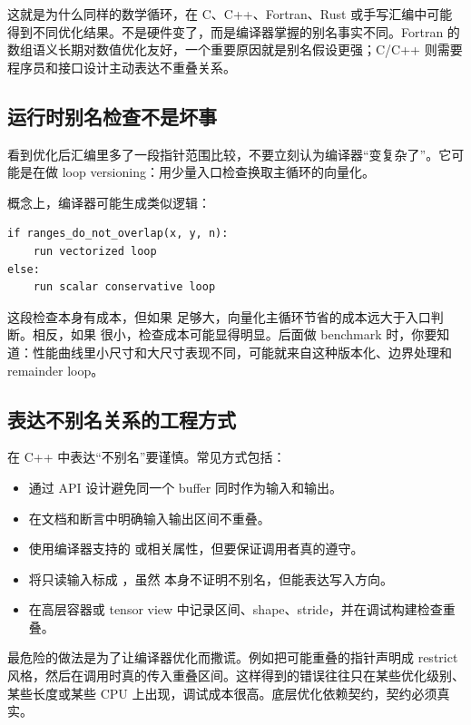 这就是为什么同样的数学循环，在 C、C++、Fortran、Rust 或手写汇编中可能得到不同优化结果。不是硬件变了，而是编译器掌握的别名事实不同。Fortran 的数组语义长期对数值优化友好，一个重要原因就是别名假设更强；C/C++ 则需要程序员和接口设计主动表达不重叠关系。

\subsection{运行时别名检查不是坏事}

看到优化后汇编里多了一段指针范围比较，不要立刻认为编译器“变复杂了”。它可能是在做 loop versioning：用少量入口检查换取主循环的向量化。

概念上，编译器可能生成类似逻辑：

\begin{lstlisting}
if ranges_do_not_overlap(x, y, n):
    run vectorized loop
else:
    run scalar conservative loop
\end{lstlisting}

这段检查本身有成本，但如果  足够大，向量化主循环节省的成本远大于入口判断。相反，如果  很小，检查成本可能显得明显。后面做 benchmark 时，你要知道：性能曲线里小尺寸和大尺寸表现不同，可能就来自这种版本化、边界处理和 remainder loop。

\subsection{表达不别名关系的工程方式}

在 C++ 中表达“不别名”要谨慎。常见方式包括：

\begin{itemize}
  \item 通过 API 设计避免同一个 buffer 同时作为输入和输出。
  \item 在文档和断言中明确输入输出区间不重叠。
  \item 使用编译器支持的  或相关属性，但要保证调用者真的遵守。
  \item 将只读输入标成 ，虽然  本身不证明不别名，但能表达写入方向。
  \item 在高层容器或 tensor view 中记录区间、shape、stride，并在调试构建检查重叠。
\end{itemize}

最危险的做法是为了让编译器优化而撒谎。例如把可能重叠的指针声明成 restrict 风格，然后在调用时真的传入重叠区间。这样得到的错误往往只在某些优化级别、某些长度或某些 CPU 上出现，调试成本很高。底层优化依赖契约，契约必须真实。


